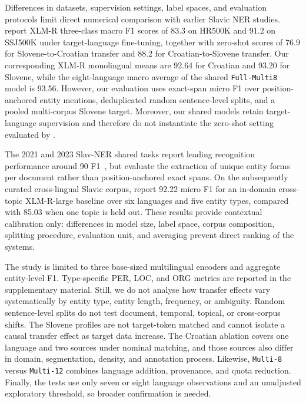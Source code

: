 \documentclass{article}
\begin{document}
Differences in datasets, supervision settings, label spaces, and evaluation protocols limit direct numerical comparison with earlier Slavic NER studies.
\textcite{ulcar2026monocross} report XLM-R three-class macro F1 scores of 83.3 on HR500K and 91.2 on SSJ500K under target-language fine-tuning, together with zero-shot scores of 76.9 for Slovene-to-Croatian transfer and 88.2 for Croatian-to-Slovene transfer.
Our corresponding XLM-R monolingual means are 92.64 for Croatian and 93.20 for Slovene, while the eight-language macro average of the shared \texttt{Full-Multi8} model is 93.56.
However, our evaluation uses exact-span micro F1 over position-anchored entity mentions, deduplicated random sentence-level splits, and a pooled multi-corpus Slovene target.
Moreover, our shared models retain target-language supervision and therefore do not instantiate the zero-shot setting evaluated by \textcite{ulcar2026monocross}.

The 2021 and 2023 Slav-NER shared tasks report leading recognition performance around 90 F1~\parencite{piskorski-etal-2021-slav,yangarber-etal-2023-slav}, but evaluate the extraction of unique entity forms per document rather than position-anchored exact spans.
On the subsequently curated cross-lingual Slavic corpus, \textcite{piskorski-etal-2024-cross} report 92.22 micro F1 for an in-domain cross-topic XLM-R-large baseline over six languages and five entity types, compared with 85.03 when one topic is held out.
These results provide contextual calibration only: differences in model size, label space, corpus composition, splitting procedure, evaluation unit, and averaging prevent direct ranking of the systems.

The study is limited to three base-sized multilingual encoders and aggregate entity-level F1.
Type-specific PER, LOC, and ORG metrics are reported in the supplementary material. Still, we do not analyse how transfer effects vary systematically by entity type, entity length, frequency, or ambiguity.
Random sentence-level splits do not test document, temporal, topical, or cross-corpus shifts.
The Slovene profiles are not target-token matched and cannot isolate a causal transfer effect as target data increase.
The Croatian ablation covers one language and two sources under nominal matching, and those sources also differ in domain, segmentation, density, and annotation process.
Likewise, \texttt{Multi-8} versus \texttt{Multi-12} combines language addition, provenance, and quota reduction.
Finally, the tests use only seven or eight language observations and an unadjusted exploratory threshold, so broader confirmation is needed.
\end{document}
